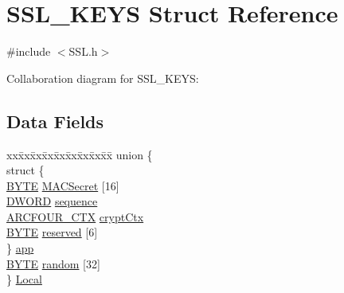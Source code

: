 \hypertarget{struct_s_s_l___k_e_y_s}{}\section{S\+S\+L\+\_\+\+K\+E\+Y\+S Struct Reference}
\label{struct_s_s_l___k_e_y_s}


{\ttfamily \#include $<$S\+S\+L.\+h$>$}



Collaboration diagram for S\+S\+L\+\_\+\+K\+E\+Y\+S\+:
\subsection*{Data Fields}
\begin{DoxyCompactItemize}
\item 
\begin{tabbing}
xx\=xx\=xx\=xx\=xx\=xx\=xx\=xx\=xx\=\kill
union \{\\
\>struct \{\\
\>\>\hyperlink{_generic_type_defs_8h_a4ae1dab0fb4b072a66584546209e7d58}{BYTE} \hyperlink{struct_s_s_l___k_e_y_s_abd95c8c720222aa5d74ba6f168a97da8}{MACSecret} \mbox{[}16\mbox{]}\\
\>\>\hyperlink{_generic_type_defs_8h_ad342ac907eb044443153a22f964bf0af}{DWORD} \hyperlink{struct_s_s_l___k_e_y_s_a8ae5d5027313c26248c36c3dcf205b55}{sequence}\\
\>\>\hyperlink{struct_a_r_c_f_o_u_r___c_t_x}{ARCFOUR\_CTX} \hyperlink{struct_s_s_l___k_e_y_s_a53bb0f6c9dc4a5310b452fc7ee4dac5d}{cryptCtx}\\
\>\>\hyperlink{_generic_type_defs_8h_a4ae1dab0fb4b072a66584546209e7d58}{BYTE} \hyperlink{struct_s_s_l___k_e_y_s_a978913f88617d12113203d8129ab02a1}{reserved} \mbox{[}6\mbox{]}\\
\>\} \hyperlink{struct_s_s_l___k_e_y_s_ab360e788c87e0e6a0bb776e23aa82b2e}{app}\\
\>\hyperlink{_generic_type_defs_8h_a4ae1dab0fb4b072a66584546209e7d58}{BYTE} \hyperlink{struct_s_s_l___k_e_y_s_ac4c550fd4b12f7b4f441146c3eaa8835}{random} \mbox{[}32\mbox{]}\\
\} \hyperlink{struct_s_s_l___k_e_y_s_a467d26872125c7cd9b2a7c388e05be25}{Local}\\


\end{tabbing}
\end{DoxyCompactItemize}
